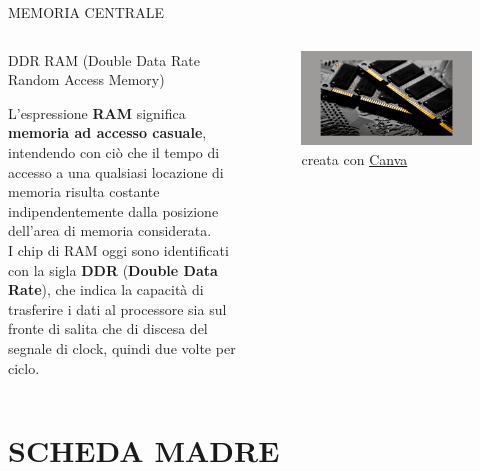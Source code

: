 \documentclass[aspectratio=1610]{beamer}
\begin{document}
\begin{frame}{MEMORIA CENTRALE}
    \begin{columns}
            \begin{alertblock}{DDR RAM (Double Data Rate Random Access Memory)}
                \begin{minipage}{0.96\linewidth}
                    \justifying
                    L'espressione \textbf{RAM} significa \textbf{memoria ad accesso casuale}, intendendo con 
                    ciò che il tempo di accesso a una qualsiasi locazione di memoria risulta costante indipendentemente 
                    dalla posizione dell'area di memoria considerata.\\
                    I chip di RAM oggi sono identificati con la sigla \textbf{DDR} (\textbf{Double Data Rate}), che indica 
                    la capacità di trasferire i dati al processore sia sul fronte di salita che di discesa 
                    del segnale di clock, quindi due volte per ciclo.
                \end{minipage}
            \end{alertblock}
            \begin{figure}
                \includegraphics[width=\linewidth]{img/ram.png}
                \caption{{creata con \href{https://www.canva.com}{Canva}}}
            \end{figure}
    \end{columns}
\end{frame}

\section{SCHEDA MADRE}
\end{document}
